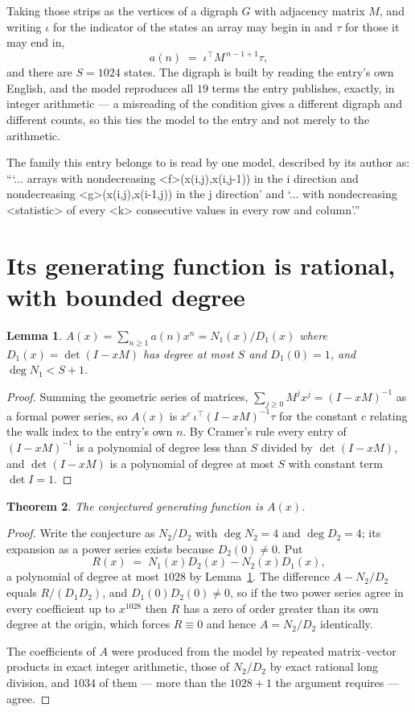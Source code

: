 \documentclass[11pt,a4paper]{article}
\theoremstyle{plain}
\newtheorem{theorem}{Theorem}
\newtheorem{lemma}[theorem]{Lemma}
\theoremstyle{definition}
\begin{document}
Taking those strips as the vertices of a digraph $G$ with adjacency matrix $M$, and writing
$\iota$ for the indicator of the states an array may begin in and $\tau$ for those it may end
in,
\[
a(n)\;=\;\iota^{\!\top}M^{\,n-1+1}\tau ,
\]
and there are $S=1024$ states. The digraph is built by reading the entry's own English, and the
model reproduces all $19$ terms the entry publishes, exactly, in integer arithmetic --- a
misreading of the condition gives a different digraph and different counts, so this ties the
model to the entry and not merely to the arithmetic.

The family this entry belongs to is read by one model, described by its author as: ```... arrays with nondecreasing <f>(x(i,j),x(i,j-1)) in the i direction and nondecreasing <g>(x(i,j),x(i-1,j)) in the j direction' and `... with nondecreasing <statistic> of every <k> consecutive values in every row and column'.''


\section{Its generating function is rational, with bounded degree}

\begin{lemma}\label{lem:rat}
$A(x)=\sum_{n\ge1}a(n)x^n=N_1(x)/D_1(x)$ where $D_1(x)=\det(I-xM)$ has degree at most
$S$ and $D_1(0)=1$, and $\deg N_1<S+1$.
\end{lemma}

\begin{proof}
Summing the geometric series of matrices, $\sum_{j\ge0}M^jx^j=(I-xM)^{-1}$ as a formal
power series, so $A(x)$ is $x^{c}\,\iota^{\!\top}(I-xM)^{-1}\tau$ for the constant $c$
relating the walk index to the entry's own $n$. By Cramer's rule every entry of
$(I-xM)^{-1}$ is a polynomial of degree less than $S$ divided by $\det(I-xM)$, and
$\det(I-xM)$ is a polynomial of degree at most $S$ with constant term $\det I=1$.
\end{proof}

\begin{theorem}
The conjectured generating function is $A(x)$.
\end{theorem}

\begin{proof}
Write the conjecture as $N_2/D_2$ with $\deg N_2=4$ and $\deg D_2=4$; its expansion as a
power series exists because $D_2(0)\neq0$. Put
\[
R(x)\;=\;N_1(x)D_2(x)-N_2(x)D_1(x),
\]
a polynomial of degree at most $1028$ by Lemma~\ref{lem:rat}. The difference
$A-N_2/D_2$ equals $R/(D_1D_2)$, and $D_1(0)D_2(0)\neq0$, so if the two power series agree in
every coefficient up to $x^{1028}$ then $R$ has a zero of order greater than its own
degree at the origin, which forces $R\equiv0$ and hence $A=N_2/D_2$ identically.

The coefficients of $A$ were produced from the model by repeated matrix--vector products in
exact integer arithmetic, those of $N_2/D_2$ by exact rational long division, and $1034$
of them --- more than the $1028+1$ the argument requires --- agree.
\end{proof}
\end{document}
